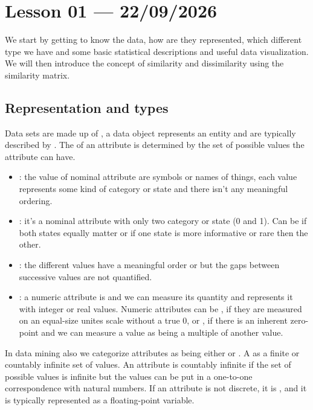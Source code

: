 \section{Lesson 01 --- 22/09/2026}

We start by getting to know the data, how are they represented, which different type we have and some basic statistical descriptions and useful data visualization. We will then introduce the concept of similarity and dissimilarity using the similarity matrix.

\subsection{Representation and types}
Data sets are made up of , a data object represents an entity and are typically described by . The  of an attribute is determined by the set of possible values the attribute can have.

\begin{itemize}
    \item {}: the value of nominal attribute are symbols or names of things, each value represents some kind of category or state and there isn't any meaningful ordering.
    \item {}: it's a nominal attribute with only two category or state (0 and 1). Can be  if both states equally matter or  if one state is more informative or rare then the other.
    \item {}: the different values have a meaningful order or  but the gaps between successive values are not quantified. 
    \item {}: a numeric attribute is  and we can measure its quantity and represents it with integer or real values. Numeric attributes can be , if they are measured on an equal-size unites scale without a true 0, or , if there is an inherent zero-point and we can measure a value as being a multiple of another value.
\end{itemize}

In data mining also we categorize attributes as being either  or . A  as a finite or countably infinite set of values. An attribute is countably infinite if the set of possible values is infinite but the values can be put in a one-to-one correspondence with natural numbers.
If an attribute is not discrete, it is , and it is typically represented as a floating-point variable.

